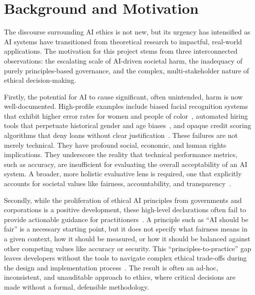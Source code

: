 \chapter{Background and Motivation}
\label{ch:background}

The discourse surrounding AI ethics is not new, but its urgency has intensified as AI systems have transitioned from theoretical research to impactful, real-world applications. The motivation for this project stems from three interconnected observations: the escalating scale of AI-driven societal harm, the inadequacy of purely principles-based governance, and the complex, multi-stakeholder nature of ethical decision-making.

Firstly, the potential for AI to cause significant, often unintended, harm is now well-documented. High-profile examples include biased facial recognition systems that exhibit higher error rates for women and people of color~\cite{buolamwini2018gender,raji2019actionable}, automated hiring tools that perpetuate historical gender and age biases~\cite{eeoc2022itutorgroup}, and opaque credit scoring algorithms that deny loans without clear justification~\cite{oneil2016weapons}. These failures are not merely technical. They have profound social, economic, and human rights implications. They underscore the reality that technical performance metrics, such as accuracy, are insufficient for evaluating the overall acceptability of an AI system. A broader, more holistic evaluative lens is required, one that explicitly accounts for societal values like fairness, accountability, and transparency~\cite{raji2020closing}.

Secondly, while the proliferation of ethical AI principles from governments and corporations is a positive development, these high-level declarations often fail to provide actionable guidance for practitioners~\cite{hagendorff2020ethics}. A principle such as \enquote{AI should be fair} is a necessary starting point, but it does not specify what fairness means in a given context, how it should be measured, or how it should be balanced against other competing values like accuracy or security. This \enquote{principles-to-practice} gap leaves developers without the tools to navigate complex ethical trade-offs during the design and implementation process~\cite{mittelstadt2019principles,whittlestone2019role}. The result is often an ad-hoc, inconsistent, and unauditable approach to ethics, where critical decisions are made without a formal, defensible methodology.

